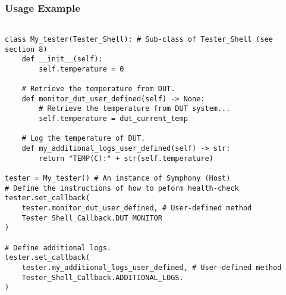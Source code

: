 \subsubsection{Usage Example}
\begin{lstlisting}

class My_tester(Tester_Shell): # Sub-class of Tester_Shell (see section 8)
    def __init__(self):
        self.temperature = 0

    # Retrieve the temperature from DUT.    
    def monitor_dut_user_defined(self) -> None:
        # Retrieve the temperature from DUT system...
        self.temperature = dut_current_temp

    # Log the temperature of DUT.
    def my_additional_logs_user_defined(self) -> str:
        return "TEMP(C):" + str(self.temperature)

tester = My_tester() # An instance of Symphony (Host)
# Define the instructions of how to peform health-check
tester.set_callback(
    tester.monitor_dut_user_defined, # User-defined method
    Tester_Shell_Callback.DUT_MONITOR
)

# Define additional logs.
tester.set_callback(
    tester.my_additional_logs_user_defined, # User-defined method
    Tester_Shell_Callback.ADDITIONAL_LOGS.
)


\end{lstlisting}
